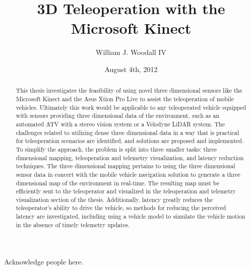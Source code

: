 \documentclass[12pt]{report}
\title{3D Teleoperation with the Microsoft Kinect}
\author{William J. Woodall IV}
\date{August 4th, 2012} %
\begin{document}

\begin{romanpages}      %

\TitlePage 


\begin{abstract} 
This thesis investigates the feasibility of using novel three dimensional sensors like the Microsoft Kinect\cite{KINECT} and the Asus Xtion Pro Live\cite{ASUS} to assist the teleoperation of mobile vehicles.  Ultimately this work would be applicable to any teleoperated vehicle equipped with sensors providing three dimensional data of the environment, such as an automated ATV with a stereo vision system or a Velodyne LiDAR\cite{halterman2010velodyne} system.  The challenges related to utilizing dense three dimensional data in a way that is practical for teleoperation scenarios are identified, and solutions are proposed and implemented.  To simplify the approach, the problem is split into three smaller tasks: three dimensional mapping, teleoperation and telemetry visualization, and latency reduction techniques.  The three dimensional mapping pertains to using the three dimensional sensor data in concert with the mobile vehicle navigation solution to generate a three dimensional map of the environment in real-time.  The resulting map must be efficiently sent to the teleoperator and visualized in the teleoperation and telemetry visualization section of the thesis.  Additionally, latency greatly reduces the teleoperator's ability to drive the vehicle, so methods for reducing the perceived latency are investigated, including using a vehicle model to simulate the vehicle motion in the absence of timely telemetry updates.
\end{abstract}


\begin{acknowledgments}
Acknowledge people here.
\end{acknowledgments}

\tableofcontents
\listoffigures
\listoftables
\listofalgorithms

\printnomenclature[0.5in] %
\end{romanpages}        %
\end{document}
